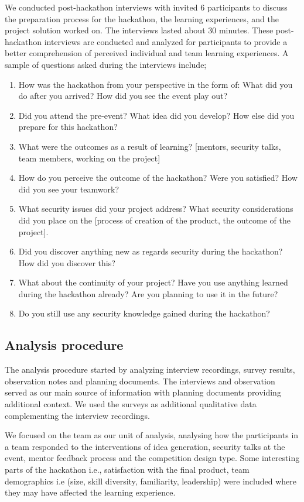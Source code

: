 \documentclass[runningheads]{llncs}
\begin{document}
We conducted post-hackathon interviews with invited 6 participants to discuss the preparation process for the hackathon, the learning experiences, and the project solution worked on. The interviews lasted about 30 minutes. These post-hackathon interviews are conducted and analyzed for participants to provide a better comprehension of perceived individual and team learning experiences. A sample of questions asked during the interviews include;
\begin{enumerate}
    \item How was the hackathon from your perspective in the form of: What did you do after you arrived? How did you see the event play out? 
    \item Did you attend the pre-event? What idea did you develop? How else did you prepare for this hackathon?
    \item What were the outcomes as a result of learning? [mentors, security talks, team members, working on the project]
    \item How do you perceive the outcome of the hackathon? Were you satisfied? How did you see your teamwork? 
    \item What security issues did your project address? What security considerations did you place on the [process of creation of the product, the outcome of the project].
    \item Did you discover anything new as regards security during the hackathon? How did you discover this?
    \item What about the continuity of your project? Have you use anything learned during the hackathon already? Are you planning to use it in the future? 
    \item Do you still use any security knowledge gained during the hackathon?
\end{enumerate}


\subsection{Analysis procedure}\label{Sec:analysisprocedure}
The analysis procedure started by analyzing interview recordings, survey results, observation notes and planning documents. The interviews and observation served as our main source of information with planning documents providing additional context. We used the surveys as additional qualitative data complementing the interview recordings.

We focused on the team as our unit of analysis, analysing how the participants in a team responded to the interventions of idea generation, security talks at the event, mentor feedback process and the competition design type. Some interesting parts of the hackathon i.e., satisfaction with the final product, team demographics i.e (size, skill diversity, familiarity, leadership) were included where they may have affected the learning experience.
\end{document}
